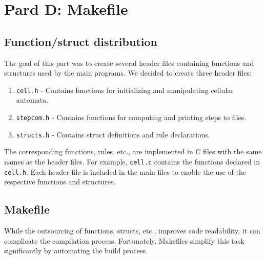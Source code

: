 \documentclass[12pt,a4paper]{article}
\begin{document}
\section{Pard D: Makefile}
\vspace{1cm}


\subsection{Function/struct distribution}
The goal of this part was to create several header files containing functions and structures used by the main programs.
\newline
We decided to create three header files:
\begin{enumerate}[label=\roman*.]
    \item \texttt{cell.h} - Contains functions for initializing and manipulating cellular automata.
    \item \texttt{stepcom.h} - Contains functions for computing and printing steps to files.
    \item \texttt{structs.h} - Contains struct definitions and rule declarations.
\end{enumerate}
The corresponding functions, rules, etc., are implemented in C files with the same names as the header files. 
For example, \texttt{cell.c} contains the functions declared in \texttt{cell.h}. Each header file is included in the main files 
to enable the use of the respective functions and structures.

\vspace{1cm}

\subsection{Makefile}
While the outsourcing of functions, structs, etc., improves code readability, it can complicate the compilation process. 
Fortunately, Makefiles simplify this task significantly by automating the build process.
\newline
\end{document}

